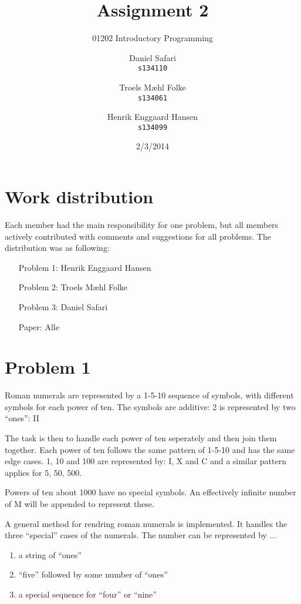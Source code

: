 \documentclass{scrartcl}
\begin{document}

\title{Assignment 2}
\subtitle{01202 Introductory Programming}
\author{
  Daniel Safari\\
  \texttt{s134110}
  \and
  Troels Mæhl Folke\\
  \texttt{s134061}
   \and
  Henrik Enggaard Hansen\\
  \texttt{s134099}
}
\date{2/3/2014}
\maketitle
\thispagestyle{empty}
\setcounter{page}{0}
\null
\vfill
\section*{Work distribution}

Each member had the main responsibility for one problem, but all members
actively contributed with comments and suggestions for all problems. The
distribution was as following:
\begin{itemize}
\setlength{\itemindent}{3em}
\item[Problem 1:] Henrik Enggaard Hansen
\item[Problem 2:] Troels Mæhl Folke
\item[Problem 3:] Daniel Safari
\item[Paper:]  Alle
\end{itemize}
\newpage
\section*{Problem 1}

Roman numerals are represented by a 1-5-10 sequence of symbols, with different symbols for each power of ten. The symbols are additive: 2 is represented by two ``ones'': II

The task is then to handle each power of ten seperately and then join them together. Each power of ten follows the same pattern of 1-5-10 and has the same edge cases. 1, 10 and 100 are represented by: I, X and C and a similar pattern applies for 5, 50, 500.

Powers of ten about 1000 have no special symbols. An effectively infinite number of M will be appended to represent these.

A general method for rendring roman numerals is implemented. It handles the three ``special'' cases of the numerals. The number can be represented by ...
\begin{enumerate}
\item a string of ``ones''
\item ``five'' followed by some number of ``ones''
\item a special sequence for ``four'' or ``nine''
\end{enumerate}
\end{document}
